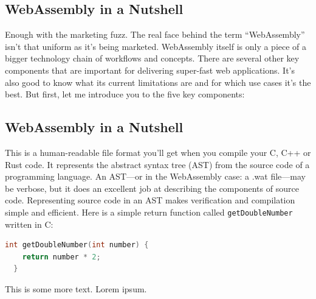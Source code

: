 \documentclass[10pt]{article}  %
\begin{document}
\begin{sloppypar}
  \subsection{WebAssembly in a Nutshell}
  \label{sec:in-a-nutshell}

  Enough with the marketing fuzz. The real face behind the term “WebAssembly” isn’t that uniform as it’s being marketed. WebAssembly itself is only a piece of a bigger technology chain of workflows and concepts. There are several other key components that are important for delivering super-fast web applications. It’s also good to know what its current limitations are and for which use cases it’s the best. But first, let me introduce you to the five key components:

  \subsection{WebAssembly in a Nutshell}
  \label{sec:webassembly-text-format}

  This is a human-readable file format you’ll get when you compile your C, C++ or Rust code. It represents the abstract syntax tree (AST) from the source code of a programming language. An AST—or in the WebAssembly case: a .wat file—may be verbose, but it does an excellent job at describing the components of source code. Representing source code in an AST makes verification and compilation simple and efficient. Here is a simple return function called \lstinline{getDoubleNumber} written in C:

  \vspace{7pt}
  \begin{lstlisting}[language=C, caption=Python example, label=lst:python-example]
  int getDoubleNumber(int number) {
    return number * 2;
  }\end{lstlisting}

  This is some more text. Lorem ipsum.

  \pagebreak
  
  

\end{sloppypar}
\end{document}

